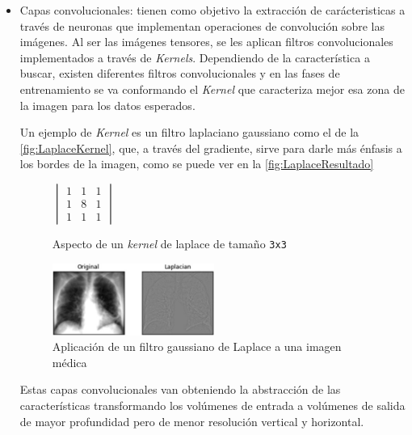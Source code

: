 \begin{itemize}
    \item Capas convolucionales: tienen como objetivo la extracción de carácteristicas a través de neuronas que implementan operaciones de convolución sobre las imágenes. 
    Al ser las imágenes tensores, se les aplican filtros convolucionales implementados a través de \textit{Kernels}. 
    Dependiendo de la característica a buscar, existen diferentes filtros convolucionales y en las fases de entrenamiento se va conformando el \textit{Kernel} que caracteriza mejor esa zona de la imagen para los datos esperados.

    Un ejemplo de \textit{Kernel} es un filtro laplaciano gaussiano como el de la \autoref{fig:LaplaceKernel}, que, a través del gradiente, sirve para darle más énfasis a los bordes de la imagen, como se puede ver 
    en la \autoref{fig:LaplaceResultado}
    \begin{figure}[H]
        \centering
        \(
        \begin{vmatrix}
            1 & 1 & 1 \\
            1 & 8 & 1 \\
            1 & 1 & 1
        \end{vmatrix}
        \)
        \caption{Aspecto de un \textit{kernel} de laplace de tamaño \texttt{3x3}}
        \label{fig:LaplaceKernel}
    \end{figure}
    \begin{figure}[H]
        \centering
        \includegraphics[width=0.5\textwidth]{images/4/KernelsTipicos.jpg}
        \caption{Aplicación de un filtro gaussiano de Laplace a una imagen médica\cite{LaplacianFilterOverview}}
        \label{fig:LaplaceResultado}
    \end{figure}

    Estas capas convolucionales van obteniendo la abstracción de las características transformando los volúmenes de entrada a volúmenes de salida de mayor profundidad pero de menor resolución vertical y horizontal.


\end{itemize}
